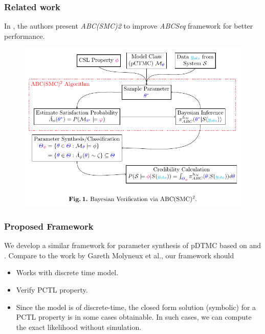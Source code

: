 \documentclass{beamer}
\begin{document}
\begin{frame}
  \frametitle{Related work}
  In \cite{molyneux2020abc}, the authors present \textit{ABC(SMC)2} to
  improve \textit{ABCSeq} framework for better performance.
  \begin{figure}[t]
    \includegraphics[height=0.7\textheight]{molyneux2020.png} \centering
  \end{figure}
\end{frame}

\begin{frame}
  \frametitle{Proposed Framework}
  We develop a similar framework for parameter synthesis of pDTMC based on
  \cite{molyneux2020abc} and \cite{molyneux2019bayesian}. Compare to the work by
  Gareth Molyneux et al., our framework should
  \begin{itemize}
    \item Works with discrete time model.
    \item Verify PCTL property.
    \item Since the model is of discrete-time, the closed form solution (symbolic)
          for a PCTL property is in some cases obtainable. In such cases, we can
          compute the exact likelihood without simulation.
  \end{itemize}
\end{frame}
\end{document}
